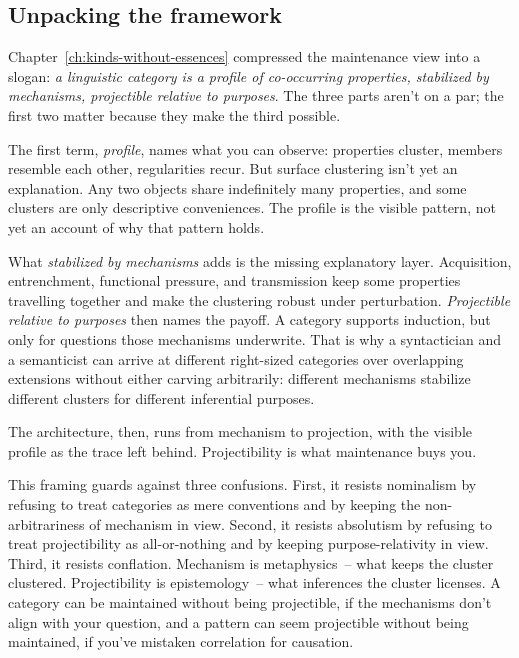 \subsection{Unpacking the framework}
\label{sec:7:slogan}

Chapter~\ref{ch:kinds-without-essences} compressed the maintenance view into a slogan: \emph{a linguistic category is a profile of co-occurring properties, stabilized by mechanisms, projectible relative to purposes}. The three parts aren't on a par; the first two matter because they make the third possible.

The first term, \emph{profile}, names what you can observe: properties cluster, members resemble each other, regularities recur. But surface clustering isn't yet an explanation. Any two objects share indefinitely many properties, and some clusters are only descriptive conveniences. The profile is the visible pattern, not yet an account of why that pattern holds.

What \emph{stabilized by mechanisms} adds is the missing explanatory layer. Acquisition, entrenchment, functional pressure, and transmission keep some properties travelling together and make the clustering robust under perturbation. \emph{Projectible relative to purposes} then names the payoff. A category supports induction, but only for questions those mechanisms underwrite. That is why a syntactician and a semanticist can arrive at different right-sized categories over overlapping extensions without either carving arbitrarily: different mechanisms stabilize different clusters for different inferential purposes.

The architecture, then, runs from mechanism to projection, with the visible profile as the trace left behind. Projectibility is what maintenance buys you.

This framing guards against three confusions. First, it resists nominalism by refusing to treat categories as mere conventions and by keeping the non-arbitrariness of mechanism in view. Second, it resists absolutism by refusing to treat projectibility as all-or-nothing and by keeping purpose-relativity in view. Third, it resists conflation. Mechanism is metaphysics~-- what keeps the cluster clustered. Projectibility is epistemology~-- what inferences the cluster licenses. A category can be maintained without being projectible, if the mechanisms don't align with your question, and a pattern can seem projectible without being maintained, if you've mistaken correlation for causation.

